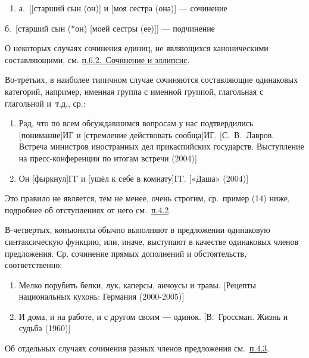 \begin{enumerate}
  \def\labelenumi{(\arabic{enumi})}
  \setcounter{enumi}{9}
  \item
        а.~{[}{[}старший сын (он){]} и {[}моя сестра (она){]} --- сочинение
\end{enumerate}

б.~{[}старший сын (*он) {[}моей сестры (ее){]}{]} --- подчинение

О некоторых случаях сочинения единиц, не являющихся каноническими
составляющими, см. \underline{п.6.2.~Сочинение и эллипсис}.

Во-третьих, в наиболее типичном случае сочиняются составляющие
одинаковых категорий, например, именная группа с именной группой,
глагольная с глагольной и~т.д., ср.:

\begin{enumerate}
  \def\labelenumi{(\arabic{enumi})}
  \setcounter{enumi}{10}
  \item
        Рад, что по всем обсуждавшимся вопросам у нас подтвердились
        {[}понимание{]}ИГ и {[}стремление действовать сообща{]}ИГ.
        {[}С.~В.~Лавров. Встреча министров иностранных дел прикаспийских
        государств. Выступление на пресс-конференции по итогам встречи
        (2004){]}
  \item
        Он {[}фыркнул{]}ГГ и {[}ушёл к себе в комнату{]}ГГ. {[}«Даша»
        (2004){]}
\end{enumerate}

Это правило не является, тем не менее, очень строгим, ср.~пример (14)
ниже, подробнее об отступлениях от него см.~\underline{п.4.2}.

В-четвертых, конъюнкты обычно выполняют в предложении одинаковую
синтаксическую функцию, или, иначе, выступают в качестве одинаковых
членов предложения. Ср. сочинение прямых дополнений и обстоятельств,
соответственно:

\begin{enumerate}
  \def\labelenumi{(\arabic{enumi})}
  \setcounter{enumi}{12}
  \item
        Мелко порубить белки, лук, каперсы, анчоусы и травы. {[}Рецепты
        национальных кухонь: Германия (2000-2005){]}
  \item
        И дома, и на работе, и с другом своим ― одинок. {[}В.~Гроссман. Жизнь
        и судьба (1960){]}
\end{enumerate}

Об отдельных случаях сочинения разных членов предложения
см.~\underline{п.4.3}.

